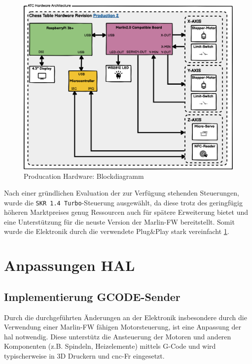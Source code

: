 \begin{figure}
\centering
\includegraphics{images/ATC_Hardware_Architecture_PROD.png}
\caption{Producation Hardware: Blockdiagramm
\label{ATC_Hardware_Architecture_PROD}}
\end{figure}

Nach einer gründlichen Evaluation der zur Verfügung stehenden
Steuerungen, wurde die \passthrough{\lstinline!SKR 1.4 Turbo!}-Steuerung
ausgewählt, da diese trotz des geringfügig höheren Marktpreises genug
Ressourcen auch für spätere Erweiterung bietet und eine Unterstützung
für die neuste Version der Marlin-FW\cite{marlinfw} bereitstellt.
Somit wurde die Elektronik durch die verwendete Plug\&Play stark
vereinfacht \ref{ATC_Hardware_Architecture_PROD}.

\hypertarget{anpassungen-hal}{%
\section{Anpassungen HAL}\label{anpassungen-hal}}

\hypertarget{implementierung-gcode-sender}{%
\subsection{Implementierung
GCODE-Sender}\label{implementierung-gcode-sender}}

Durch die durchgeführten Änderungen an der Elektronik insbesondere durch
die Verwendung einer Marlin-FW\cite{marlinfw} fähigen
Motorsteuerung, ist eine Anpassung der \gls{hal} notwendig. Diese
unterstütz die Ansteuerung der Motoren und anderen Komponenten (z.B.
Spindeln, Heizelemente) mittels G-Code und wird typischerweise in 3D
Druckern und \gls{cnc}-Fr eingesetzt.

